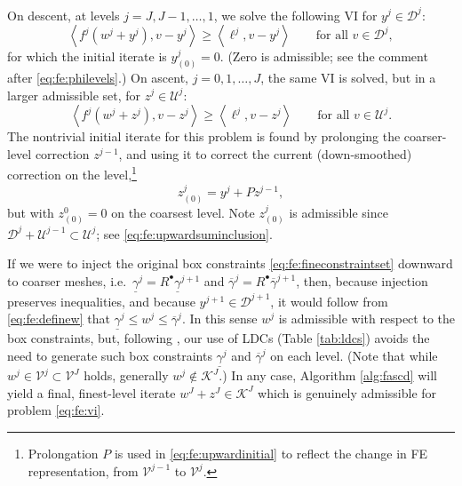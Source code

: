 \documentclass[letterpaper,final,12pt,reqno]{amsart}
\theoremstyle{cstyle}
\theoremstyle{cstyle*}
\theoremstyle{dstyle}
\numberwithin{equation}{section}
\numberwithin{figure}{section}
\numberwithin{table}{section}
\numberwithin{theorem}{section}
\newcommand{\cK}{\mathcal{K}}
\newcommand{\cV}{\mathcal{V}}
\newcommand{\ip}[2]{\left<#1,#2\right>}
\newcommand{\iR}{R^{\bullet}}
\begin{document}
On descent, at levels $j=J,J-1,\dots,1$, we solve the following VI for $y^j \in \mathcal{D}^j$:
\begin{equation}
\ip{f^j(w^j + y^j)}{v-y^j} \ge \ip{\ell^j}{v-y^j} \qquad \text{for all } v\in \mathcal{D}^j, \label{eq:fe:downvi}
\end{equation}
for which the initial iterate is $y_{(0)}^j=0$.  (Zero is admissible; see the comment after \eqref{eq:fe:philevels}.)  On ascent, $j=0,1,\dots,J$, the same VI is solved, but in a larger admissible set, for $z^j \in \mathcal{U}^j$:
\begin{equation}
\ip{f^j(w^j + z^j)}{v-z^j} \ge \ip{\ell^j}{v-z^j} \qquad \text{for all } v\in \mathcal{U}^j. \label{eq:fe:upvi}
\end{equation}
The nontrivial initial iterate for this problem is found by prolonging the coarser-level correction $z^{j-1}$, and using it to correct the current (down-smoothed) correction on the level,\footnote{Prolongation $P$ is used in \eqref{eq:fe:upwardinitial} to reflect the change in FE representation, from $\mathcal{V}^{j-1}$ to $\mathcal{V}^{j}$.}
\begin{equation}
z_{(0)}^j = y^j + P z^{j-1},  \label{eq:fe:upwardinitial}
\end{equation}
but with $z_{(0)}^0=0$ on the coarsest level.  Note $z_{(0)}^j$ is admissible since $\mathcal{D}^j + \mathcal{U}^{j-1} \subset \mathcal{U}^j$; see \eqref{eq:fe:upwardsuminclusion}.

If we were to inject the original box constraints \eqref{eq:fe:fineconstraintset} downward to coarser meshes, i.e.~$\underline{\gamma}^j = \iR \underline{\gamma}^{j+1}$ and $\overline{\gamma}^j = \iR \overline{\gamma}^{j+1}$, then, because injection preserves inequalities, and because $y^{j+1} \in \mathcal{D}^{j+1}$, it would follow from \eqref{eq:fe:definew} that $\underline{\gamma}^j \le w^j \le \overline{\gamma}^j$.  In this sense $w^j$ is admissible with respect to the box constraints, but, following \cite{GraeserKornhuber2009}, our use of LDCs (Table \ref{tab:ldcs}) avoids the need to generate such box constraints $\underline{\gamma}^j$ and $\overline{\gamma}^j$ on each level.  (Note that while $w^j \in \cV^j \subset \cV^J$ holds, generally $w^j \notin \cK^J$.)  In any case, Algorithm \ref{alg:fascd} will yield a final, finest-level iterate $w^J+z^J \in \cK^J$ which is genuinely admissible for problem \eqref{eq:fe:vi}.
\end{document}

